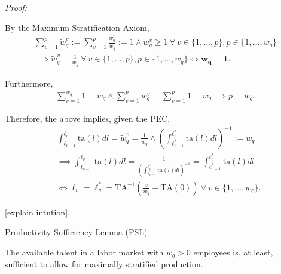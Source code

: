 \documentclass[hidelinks, nonatbib]{elsarticle}
\begin{document}
\begin{enumerate}
\textit{Proof:}

By the Maximum Stratification Axiom,
\begin{gather}
    \sum_{v=1}^{p}{
        \tilde{w}_{q}^{v}
    }
    :=
    \sum_{v=1}^{p}{
        \frac{
            w_{q}^{v}
        }{
            w_q
        }
    }
    := 1
    \land
    w_{q}^{v} 
    \geq 
    1
    \
    \forall
    \
    v \in \{1, \dots, p\},
    p \in \{1, \dots, w_q\}
    \\
    \implies
    \tilde{w}_{q}^{v} =
    \frac{1}{w_q}
    \
    \forall
    \
    v \in \{1, \dots, p\},
    p \in \{1, \dots, w_q\}
    \iff
    \boldsymbol{w_q} =
    \boldsymbol{1}
    .
\end{gather}

Furthermore,
\begin{gather}
    \sum_{v=1}^{w_q}
    1
    =
    w_q
    \land
    \sum_{v=1}^{p}{
        w_{q}^{v}
    }
    =
    \sum_{v=1}^{p}{
            1
    }
    = w_q
    \implies
    p = w_q
    .
\end{gather}

Therefore, the above implies, given the PEC,
\begin{align}
    &
    \int_{\ell_{v-1}}^{\ell_{v}}{
        \text{ta}(l)
        dl
    }
    =
    \tilde{w}_{q}^{v} =
    \frac{1}{w_q}
    \land
    \left(
        \int_{
            \ell_{v-1}^{*}
        }^{
            \ell_{v}^{*}    
        }{
            \text{ta}(l)
            dl
        }
    \right) ^ {-1}
    :=
    w_q
    \\
    &
    \implies
    \int_{\ell_{v-1}}^{\ell_{v}}{
        \text{ta}(l)
        dl
    }
    =
    \frac{1}{
        \left(
            \int_{
                \ell_{v-1}^{*}
            }^{
                \ell_{v}^{*}    
            }{
                \text{ta}(l)
                dl
            }
        \right) ^ {-1}
    }
    =
    \int_{
        \ell_{v-1}^{*}
    }^{
        \ell_{v}^{*}    
    }{
        \text{ta}(l)
        dl
    }
    \\
    &
    \iff
    \ell_{v}
    =
    \ell_{v}^{*}
    =
    \text{TA}^{-1}\left(
        \frac{v}{w_q}
        +
        \text{TA}(0)
    \right)
    \
    \forall
    \
    v \in \{1, \dots, w_q\}
    .
\end{align}

[explain intution].

Productivity Sufficiency Lemma (PSL)

The available talent in a labor market with $w_q > 0$ employees is, at least, sufficient to allow for maximally stratified production.


\end{enumerate}
\end{document}
